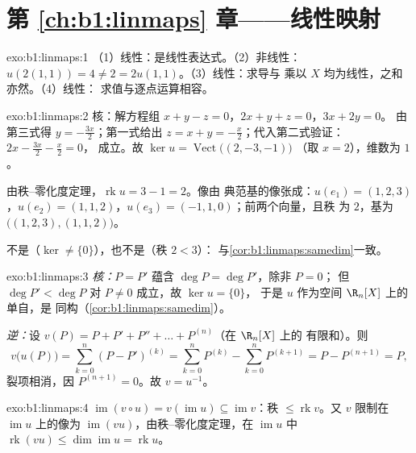 \section*{第 \ref{ch:b1:linmaps} 章——线性映射}

\begin{solution}{exo:b1:linmaps:1}
（1）线性：是线性表达式。（2）非线性：
$u(2(1,1)) = 4 \neq 2 = 2u(1,1)$。（3）线性：求导与
乘以 $X$ 均为线性，之和亦然。（4）线性：
求值与逐点运算相容。
\end{solution}

\begin{solution}{exo:b1:linmaps:2}
核：解方程组 $x + y - z = 0$，$2x + y + z = 0$，$3x + 2y = 0$。
由第三式得 $y = -\frac{3x}{2}$；第一式给出 $z = x + y =
-\frac x2$；代入第二式验证：$2x - \frac{3x}{2} - \frac x2 = 0$，
成立。故 $\ker u = \operatorname{Vect}\bigl((2, -3, -1)\bigr)$
（取 $x = 2$），维数为 $1$。

由秩–零化度定理，$\operatorname{rk} u = 3 - 1 = 2$。像由
典范基的像张成：$u(e_1) = (1,2,3)$，$u(e_2) =
(1,1,2)$，$u(e_3) = (-1,1,0)$；前两个向量，且秩
为 $2$，基为 $\bigl((1,2,3), (1,1,2)\bigr)$。

不是（$\ker \neq \{0\}$），也不是（秩 $2 < 3$）：
与\cref{cor:b1:linmaps:samedim}一致。
\end{solution}

\begin{solution}{exo:b1:linmaps:3}
\emph{核：}$P = P'$ 蕴含 $\deg P = \deg P'$，除非 $P = 0$；
但 $\deg P' < \deg P$ 对 $P \neq 0$ 成立，故 $\ker u = \{0\}$，
于是 $u$ 作为空间 $\R_n[X]$ 上的单自，是
同构（\cref{cor:b1:linmaps:samedim}）。

\emph{逆：}设 $v(P) = P + P' + P'' + \dots + P^{(n)}$（在 $\R_n[X]$ 上的
有限和）。则
\[
v\bigl(u(P)\bigr) = \sum_{k=0}^{n} (P - P')^{(k)}
= \sum_{k=0}^{n} P^{(k)} - \sum_{k=0}^{n} P^{(k+1)}
= P - P^{(n+1)} = P ,
\]
裂项相消，因 $P^{(n+1)} = 0$。故 $v = u^{-1}$。
\end{solution}

\begin{solution}{exo:b1:linmaps:4}
$\operatorname{im}(v \circ u) = v(\operatorname{im} u) \subseteq
\operatorname{im} v$：秩 $\leq \operatorname{rk} v$。又 $v$
限制在 $\operatorname{im} u$ 上的像为
$\operatorname{im}(vu)$，由秩–零化度定理，在
$\operatorname{im} u$ 中 $\operatorname{rk}(vu) \leq
\dim\operatorname{im} u = \operatorname{rk} u$。
\end{solution}

